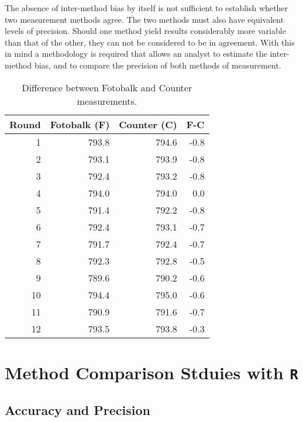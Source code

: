 \documentclass[12pt, a4paper]{report}
\begin{document}
The absence of inter-method bias by itself is not sufficient to
establish whether two measurement methods agree. The two
methods must also have equivalent levels of precision. Should one
method yield results considerably more variable than that of the
other, they can not be considered to be in agreement. With this in
mind a methodology is required that allows an analyst to estimate
the inter-method bias, and to compare the precision of both
methods of measurement.
\newpage
\begin{table}[h!]
	
	\begin{center}
		
		\begin{tabular}{rrrr}
			\hline
			Round& Fotobalk (F) & Counter (C) & F-C \\
			\hline
			1 & 793.8& 794.6 & -0.8 \\
			2 & 793.1 & 793.9 & -0.8 \\
			3 & 792.4 & 793.2 & -0.8 \\
			4 & 794.0 & 794.0 & 0.0 \\
			5 & 791.4 & 792.2 & -0.8 \\
			6 & 792.4 & 793.1 & -0.7 \\
			7 & 791.7 & 792.4 & -0.7 \\
			8 & 792.3 & 792.8 & -0.5 \\
			9 & 789.6 & 790.2 & -0.6 \\
			10 & 794.4 & 795.0 & -0.6 \\
			11 & 790.9 & 791.6 & -0.7 \\
			12 & 793.5 & 793.8 & -0.3 \\
			\hline
		\end{tabular}
		\caption{Difference between Fotobalk and Counter measurements.}
	\end{center}
\end{table}

\bigskip



\section{Method Comparison Stduies with \texttt{R}}

\subsection{Accuracy and Precision}
\end{document}
